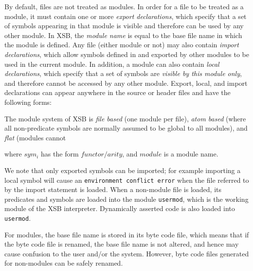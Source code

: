 By default, files are not treated as modules.  In order for a file to
be treated as a module, it must contain one or more {\it export
declarations}, which specify that a set of symbols appearing in that
module is visible and therefore can be used by any other module.  In
XSB, the {\em module name} is equal to the base file name in which the
module is defined.  Any file (either module or not) may also contain
{\it import declarations}, which allow symbols defined in and exported
by other modules to be used in the current module.  In addition, a
module can also contain {\it local declarations}, which specify that a
set of symbols are {\it visible by this module only}, and therefore
cannot be accessed by any other module.  Export, local, and import
declarations can appear anywhere in the source or header files and
have the following forms:

The module system of XSB is {\em file based} (one module per
file), {\em atom based} (where all non-predicate symbols are normally
assumed to be global to all modules), and {\em flat} (modules cannot




\noindent
where $sym_i$ has the form $functor/arity$, and $module$ is a module
name.

We note that only exported symbols can be imported; for example
importing a local symbol will cause an {\tt environment conflict
error} when the file referred to by the import statement is loaded.
When a non-module file is loaded, its predicates and symbols are
loaded into the module {\tt usermod}, which is the working module of
the XSB interpreter.  Dynamically asserted code is also loaded into
{\tt usermod}.

For modules, the base file name is stored in its byte code file, which
means that if the byte code file is renamed, the base file name is not
altered, and hence may cause confusion to the user and/or the system.
However, byte code files generated for non-modules can be safely
renamed.

